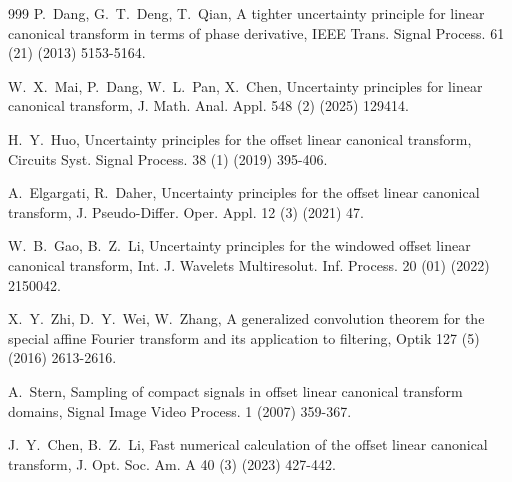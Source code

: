 \documentclass[preprint,12pt]{elsarticle}
\begin{document}
\begin{thebibliography}{999}
	P.~Dang, G.~T.~Deng, T.~Qian, A tighter uncertainty principle for linear canonical transform in terms of phase derivative, IEEE Trans. Signal Process. 61 (21) (2013) 5153-5164.
	
	W.~X.~Mai, P.~Dang, W.~L.~Pan, X.~Chen, Uncertainty principles for linear canonical transform, J. Math. Anal. Appl. 548 (2) (2025) 129414.
	
	H.~Y.~Huo, Uncertainty principles for the offset linear canonical transform, Circuits Syst. Signal Process. 38 (1) (2019) 395-406.
	
	A.~Elgargati, R.~Daher, Uncertainty principles for the offset linear canonical transform, J. Pseudo-Differ. Oper. Appl. 12 (3) (2021) 47.
	
	W.~B.~Gao, B.~Z.~Li, Uncertainty principles for the windowed offset linear canonical transform, Int. J. Wavelets Multiresolut. Inf. Process. 20 (01) (2022) 2150042.
	
	X.~Y.~Zhi, D.~Y.~Wei, W.~Zhang, A generalized convolution theorem for the special affine Fourier transform and its application to filtering, Optik 127 (5) (2016) 2613-2616.
	
	A.~Stern, Sampling of compact signals in offset linear canonical transform domains, Signal Image Video Process. 1 (2007) 359-367.
	
	J.~Y.~Chen, B.~Z.~Li, Fast numerical calculation of the offset linear canonical transform, J. Opt. Soc. Am. A 40 (3) (2023) 427-442.

	
	
\end{thebibliography}
\end{document}
